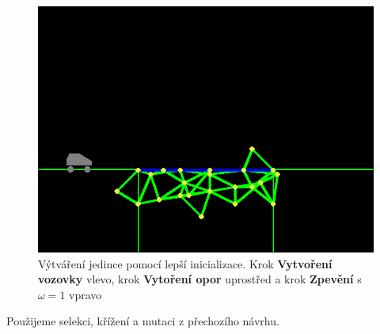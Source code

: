 \begin{figure}[ht]
\begin{minipage}{0.32\textwidth}
        \includegraphics[width=\linewidth]{img/better_init3.png}
    \end{minipage}
    \caption{Výtváření jedince pomocí lepší inicializace. Krok \textbf{Vytvoření vozovky} vlevo, krok \textbf{Vytoření opor} uprostřed a krok \textbf{Zpevění} s $\omega = 1$ vpravo}
    \label{impl-fig:7}
\end{figure}

Použijeme selekci, křížení a mutaci z přechozího návrhu.
